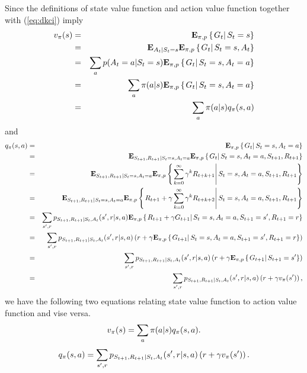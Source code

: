 Since the definitions of state value function and action value function together with (\ref{eq:dkci}) imply
\begin{eqnarray*}
v_{\pi}(s)
&=& \mathbf{E}_{\pi,p} \left\{\left.G_{t}\right|S_t = s\right\}
\\
&=& \mathbf{E}_{A_t|S_t =s} \mathbf{E}_{\pi,p} \left\{\left.G_{t}\right|S_t = s, A_t\right\}
\\
&=& \sum_a p(A_t=a|S_t =s) \mathbf{E}_{\pi,p} \left\{\left.G_{t}\right|S_t = s, A_t=a\right\}
\\
&=& \sum_a \pi(a|s) \mathbf{E}_{\pi,p} \left\{\left.G_{t}\right|S_t = s, A_t=a\right\}
\\
&=& \sum_a \pi(a|s) q_{\pi}(s,a)
\end{eqnarray*}
and
\begin{eqnarray*}
q_{\pi}(s, a)
&=& \mathbf{E}_{\pi,p} \left\{\left.G_{t}\right|S_t = s, A_t = a\right\}
\\
&=& \mathbf{E}_{S_{t+1}, R_{t+1}|S_t=s,A_t=a} \mathbf{E}_{\pi,p} \left\{\left.G_{t}\right|S_t = s, A_t = a, S_{t+1}, R_{t+1} \right\}
\\
&=& \mathbf{E}_{S_{t+1}, R_{t+1}|S_t=s,A_t=a} \mathbf{E}_{\pi,p} \left\{\left.\sum_{k=0}^\infty \gamma^k R_{t+k+1}\right|S_t = s, A_t = a, S_{t+1}, R_{t+1} \right\}
\\
&=& \mathbf{E}_{S_{t+1}, R_{t+1}|S_t=s,A_t=a} \mathbf{E}_{\pi,p} \left\{\left.R_{t+1} + \gamma \sum_{k=0}^\infty \gamma^k R_{t+k+2}\right|S_t = s, A_t = a, S_{t+1}, R_{t+1} \right\}
\\
&=& \sum_{{s'}, r} p_{S_{t+1}, R_{t+1}|S_t,A_t}({s'}, r|s,a) \mathbf{E}_{\pi,p} \left\{\left.R_{t+1} + \gamma G_{t+1} \right|S_t = s, A_t = a, S_{t+1} = {s'}, R_{t+1} =r\right\}
\\
&=& \sum_{{s'}, r} p_{S_{t+1}, R_{t+1}|S_t,A_t}({s'}, r|s,a) \left( r + \gamma \mathbf{E}_{\pi,p} \left\{\left.G_{t+1}\right|S_t = s, A_t = a, S_{t+1} = {s'}, R_{t+1} =r\right\} \right)
\\
&=& \sum_{{s'}, r} p_{S_{t+1}, R_{t+1}|S_t,A_t}({s'}, r|s,a) \left( r + \gamma \mathbf{E}_{\pi,p} \left\{\left.G_{t+1}\right|S_{t+1} = {s'}\right\} \right)
\\
&=& \sum_{{s'}, r} p_{S_{t+1}, R_{t+1}|S_t,A_t}({s'}, r|s,a) \left( r + \gamma v_{\pi}({s'}) \right),
\end{eqnarray*}
we have the following two equations relating state value function to action value function and vise versa.
\begin{equation}
\label{eq:rel:v-a}
v_{\pi}(s) = \sum_a \pi(a|s) q_{\pi}(s,a).
\end{equation}
\begin{equation}
\label{eq:rel:a-v}
q_{\pi}(s, a)
= \sum_{{s'}, r} p_{S_{t+1}, R_{t+1}|S_t,A_t}({s'}, r|s,a) \left( r + \gamma v_{\pi}({s'}) \right).
\end{equation}

